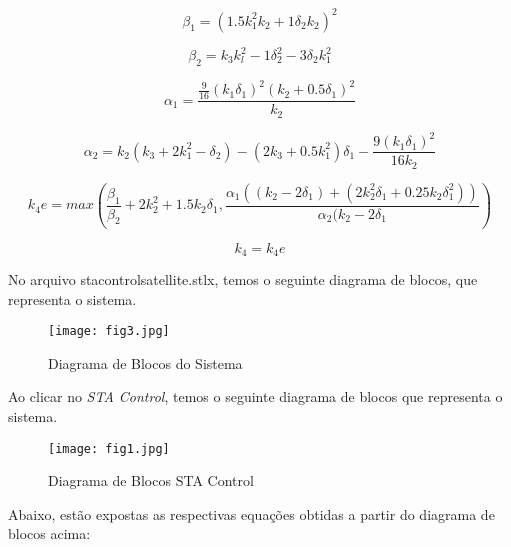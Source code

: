 \documentclass[12pt]{article}
\begin{document}
\begin{itemize}
    \begin{equation*}
        \beta_1 = \left(1.5k_1^2k_2 + 1\delta_2k_2\right)^2
    \end{equation*}
    
    \begin{equation*}
        \beta_2 = k_3k_l^2 - 1\delta_2^2 - 3\delta_2k_1^2
    \end{equation*}
    
    \begin{equation*}
        \alpha_1 = \frac{\frac{9}{16}(k_1\delta_1)^2(k_2 + 0.5\delta_1)^2}{k_2}
    \end{equation*}
    
    \begin{equation*}
        \alpha_2 = k_2(k_3 + 2k_1^2 - \delta_2) - (2k_3 + 0.5k_1^2)\delta_1   - \frac{9(k_1\delta_1)^2}{16k_2}
    \end{equation*}
     
    \begin{equation*}
         k_4e = max\left(\frac{\beta_1}{\beta_2} + 2k_2^2 + 1.5k_2\delta_1, \frac{\alpha_1\left((k_2-2 \delta_1) + (2k_2^2 \delta_1 + 0.25k_2 \delta_1^2)\right)}{\alpha_2(k_2-2\delta_1}\right)
     \end{equation*}
      
     \begin{equation*}
        k_4 = k_4e   
     \end{equation*}
     
\end{itemize}

\quad No arquivo sta\underline{\hspace{.05in}}control\underline{\hspace{.05in}}satellite.stlx, temos o seguinte diagrama de blocos, que representa o sistema.

\begin{figure}[H] 
    \centering
    \texttt{[image: fig3.jpg]}
    \caption{Diagrama de Blocos do Sistema}
\end{figure}

\quad Ao clicar no \emph{STA Control}, temos o seguinte diagrama de blocos que representa o sistema.

\begin{figure}[H] 
    \centering
    \texttt{[image: fig1.jpg]}
    \caption{Diagrama de Blocos STA Control}
\end{figure}

\quad Abaixo, estão expostas as respectivas equações obtidas a partir do diagrama de blocos acima: 
\end{document}

